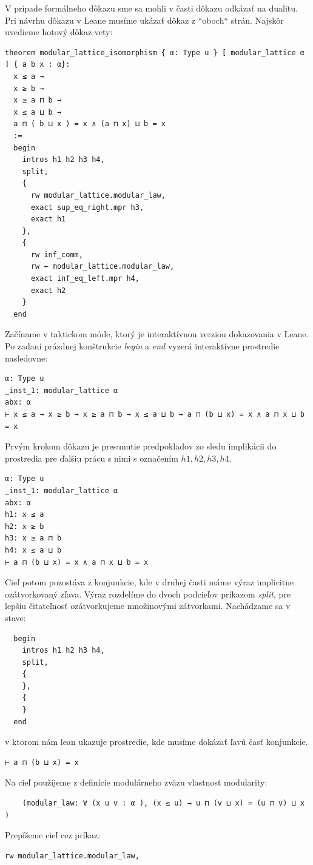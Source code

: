 \documentclass[a4paper,10pt,oneside]{report}%
\begin{document}
    V prípade formálneho dôkazu sme sa mohli v časti dôkazu odkázať na dualitu.
    Pri návrhu dôkazu v Leane musíme ukázať dôkaz z ``oboch`` strán. Najskôr uvedieme
hotový dôkaz vety:
\begin{lstlisting}
theorem modular_lattice_isomorphism { α: Type u } [ modular_lattice α ] { a b x : α}:
  x ≤ a →
  x ≥ b →
  x ≥ a ⊓ b →
  x ≤ a ⊔ b →
  a ⊓ ( b ⊔ x ) = x ∧ (a ⊓ x) ⊔ b = x
  :=
  begin
    intros h1 h2 h3 h4,
    split,
    {
      rw modular_lattice.modular_law,
      exact sup_eq_right.mpr h3,
      exact h1
    },
    {
      rw inf_comm,
      rw ← modular_lattice.modular_law,
      exact inf_eq_left.mpr h4,
      exact h2
    }
  end
\end{lstlisting}
    Začíname v taktickom móde, ktorý je interaktívnou verziou dokazovania v Leane.
    Po zadaní prázdnej konštrukcie \emph{begin} a \emph{end} vyzerá interaktívne prostredie nasledovne:
\begin{lstlisting}
α: Type u
_inst_1: modular_lattice α
abx: α
⊢ x ≤ a → x ≥ b → x ≥ a ⊓ b → x ≤ a ⊔ b → a ⊓ (b ⊔ x) = x ∧ a ⊓ x ⊔ b = x
\end{lstlisting}
    Prvým krokom dôkazu je presunutie predpokladov zo sledu implikácii do
prostredia pre ďalšiu prácu s nimi s označením $h1,h2,h3,h4$.
\begin{lstlisting}
α: Type u
_inst_1: modular_lattice α
abx: α
h1: x ≤ a
h2: x ≥ b
h3: x ≥ a ⊓ b
h4: x ≤ a ⊔ b
⊢ a ⊓ (b ⊔ x) = x ∧ a ⊓ x ⊔ b = x
\end{lstlisting}
        Cieľ potom pozostáva z konjunkcie, kde v druhej časti máme výraz implicitne
ozátvorkovaný zľava.
    Výraz rozdelíme do dvoch podcieľov príkazom \emph{split}, pre lepšiu
čitateľnosť ozátvorkujeme množinovými zátvorkami. Nachádzame sa v stave:
\begin{lstlisting}
  begin
    intros h1 h2 h3 h4,
    split,
    {
    },
    {
    }
  end
\end{lstlisting}
v ktorom nám lean ukazuje prostredie, kde musíme dokázať ľavú časť konjunkcie.
\begin{lstlisting}
⊢ a ⊓ (b ⊔ x) = x
\end{lstlisting}
Na cieľ použijeme z definície modulárneho zväzu vlastnosť modularity:
\begin{lstlisting}
    (modular_law: ∀ (x u v : α ), (x ≤ u) → u ⊓ (v ⊔ x) = (u ⊓ v) ⊔ x )
\end{lstlisting}
Prepíšeme cieľ cez príkaz:
\begin{lstlisting}
rw modular_lattice.modular_law,
\end{lstlisting}
\end{document}
